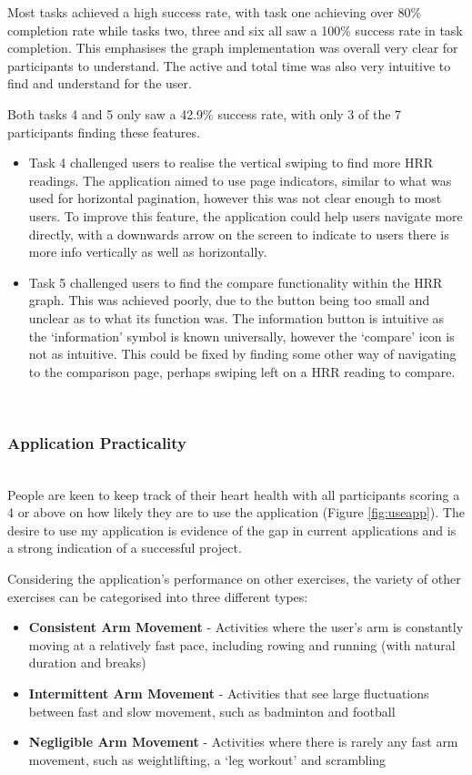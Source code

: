 \documentclass{l4proj}
\begin{document}
Most tasks achieved a high success rate, with task one achieving over 80\% completion rate while tasks two, three and six all saw a 100\% success rate in task completion. This emphasises the graph implementation was overall very clear for participants to understand. The active and total time was also very intuitive to find and understand for the user.

Both tasks 4 and 5 only saw a 42.9\% success rate, with only 3 of the 7 participants finding these features. 

\begin{itemize}
    \item Task 4 challenged users to realise the vertical swiping to find more HRR readings. The application aimed to use page indicators, similar to what was used for horizontal pagination, however this was not clear enough to most users. To improve this feature, the application could help users navigate more directly, with a downwards arrow on the screen to indicate to users there is more info vertically as well as horizontally.
    \item Task 5 challenged users to find the compare functionality within the HRR graph. This was achieved poorly, due to the button being too small and unclear as to what its function was. The information button is intuitive as the ‘information’ symbol is known universally, however the ‘compare’ icon is not as intuitive. This could be fixed by finding some other way of navigating to the comparison page, perhaps swiping left on a HRR reading to compare.
\end{itemize}

\noindent\mbox{}\\
\subsubsection{Application Practicality}
\noindent\mbox{}\\

People are keen to keep track of their heart health with all participants scoring a 4 or above on how likely they are to use the application (Figure \ref{fig:useapp}). The desire to use my application is evidence of the gap in current applications and is a strong indication of a successful project.

Considering the application’s performance on other exercises, the variety of other exercises can be categorised into three different types:

\begin{itemize}
    \item \textbf{Consistent Arm Movement} - Activities where the user’s arm is constantly moving at a relatively fast pace, including rowing and running (with natural duration and breaks)
    \item \textbf{Intermittent Arm Movement} - Activities that see large fluctuations between fast and slow movement, such as badminton and football
    \item \textbf{Negligible Arm Movement} - Activities where there is rarely any fast arm movement, such as weightlifting, a ‘leg workout’ and scrambling
\end{itemize}
\end{document}
